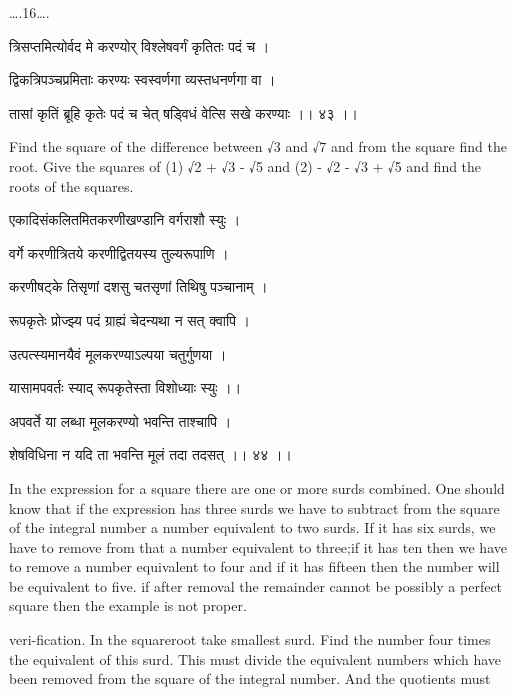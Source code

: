 \documentclass[]{article}
\date{}
\begin{document}
{\ldots{}.16\ldots{}. }

{त्रिसप्तमित्योर्वद मे करण्योर् विश्लेषवर्गं कृतितः पदं च । }

{द्विकत्रिपञ्चप्रमिताः करण्यः स्वस्वर्णगा व्यस्तधनर्णगा वा । }

{तासां कृतिं ब्रूहि कृतेः पदं च चेत् षड्विधं वेत्सि सखे करण्याः ।। ४३ ।।
}

{Find the square of the difference between }{√}{3 and }{√}{7 and from
the square find the root. Give the squares of (1) }{√}{2 + }{√}{3 -
}{√}{5 and (2) - }{√}{2 - }{√}{3 + }{√}{5 and find the roots of the
squares.}

{एकादिसंकलितमितकरणीखण्डानि वर्गराशौ स्युः । }

{वर्गे करणीत्रितये करणीद्वितयस्य तुल्यरूपाणि । }

{करणीषट्के तिसृणां दशसु चतसृणां तिथिषु पञ्चानाम् । }

{रूपकृतेः प्रोज्झ्य पदं ग्राह्यं चेदन्यथा न सत् क्वापि । }

{उत्पत्स्यमानयैवं मूलकरण्याऽल्पया चतुर्गुणया । }

{यासामपवर्तः स्याद् रूपकृतेस्ता विशोध्याः स्युः ।। }

{अपवर्ते या लब्धा मूलकरण्यो भवन्ति ताश्चापि । }

{शेषविधिना न यदि ता भवन्ति मूलं तदा तदसत् ।। ४४ ।। }

{In the expression for a square there are one or more surds combined.
One should know that if the expression has three surds we have to
subtract from the square of the integral number a number equivalent to
two surds. If it has six surds, we have to remove from that a number
equivalent to three;if it has ten then we have to remove a number
equivalent to four and if it has fifteen then the number will be
equivalent to five. if after removal the remainder cannot be possibly a
perfect square then the example is not proper.}

{veri-fication. In the squareroot take smallest surd. Find the number
four times the equivalent of this surd. This must divide the equivalent
numbers which have been removed from the square of the integral number.
And the quotients must}
\end{document}
